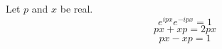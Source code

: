 \documentclass{article}
\begin{document}
Let $p$ and $x$ be real.
\begin{equation}
e^{ipx} e^{-ipx} = 1
\label{eq:a}
\end{equation}
\begin{equation}
px + xp = 2px
\label{eq:b}
\end{equation}
\begin{equation}
px - xp = 1
\label{eq:c}
\end{equation}
\end{document}
